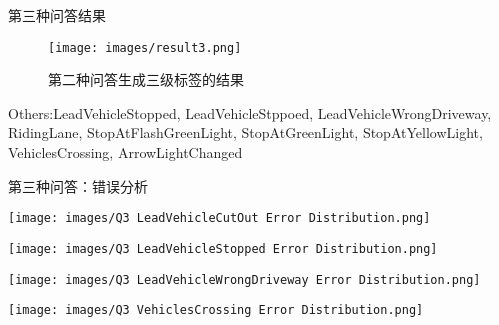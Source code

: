 \documentclass[serif]{beamer}
\begin{document}
\begin{frame}{第三种问答结果}

\begin{figure}
    \centering
    \texttt{[image: images/result3.png]}
    \caption{第二种问答生成三级标签的结果}
\end{figure}


\scriptsize
Others:LeadVehicleStopped, LeadVehicleStppoed, LeadVehicleWrongDriveway, RidingLane, StopAtFlashGreenLight, StopAtGreenLight, StopAtYellowLight, VehiclesCrossing, ArrowLightChanged
\normalsize
\end{frame}


\begin{frame}{第三种问答：错误分析}

\begin{minipage}[t]{0.4\textwidth}
  \centering
  \texttt{[image: images/Q3 LeadVehicleCutOut Error Distribution.png]}
\end{minipage}
\hfill
\begin{minipage}[t]{0.4\textwidth}
  \centering
  \texttt{[image: images/Q3 LeadVehicleStopped Error Distribution.png]}
\end{minipage}


\begin{minipage}[t]{0.4\textwidth}
  \centering
  \texttt{[image: images/Q3 LeadVehicleWrongDriveway Error Distribution.png]}
\end{minipage}
\hfill
\begin{minipage}[t]{0.4\textwidth}
  \centering
  \texttt{[image: images/Q3 VehiclesCrossing Error Distribution.png]}
\end{minipage}


\end{frame}
\end{document}
